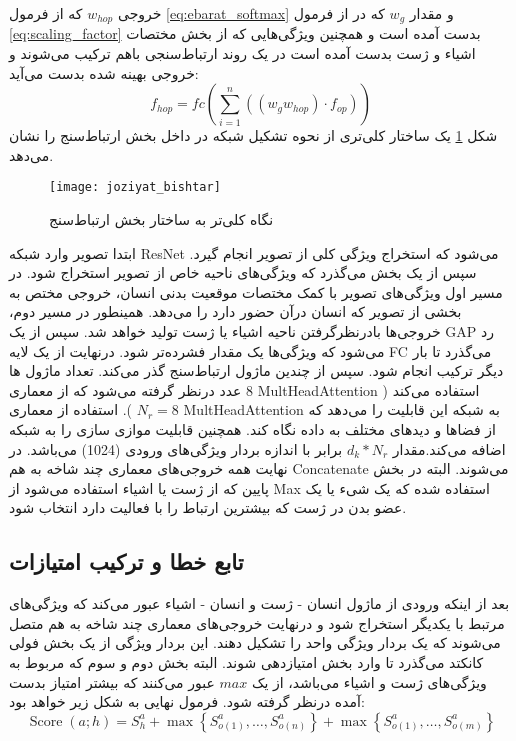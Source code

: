  خروجی %
  $w_{hop}$
  که از فرمول %
 \ref{eq:ebarat_softmax}
  و مقدار %
 $w_g$
 که در از فرمول %
 \ref{eq:scaling_factor}
 بدست آمده است و همچنین ویژگی‌هایی که از بخش مختصات اشیاء و ژست بدست آمده است در یک روند ارتباط‌سنجی باهم ترکیب می‌شوند و خروجی بهینه شده بدست می‌آید:
 \begin{equation}
 	f_{h o p}=f c\left(\sum_{i=1}^n\left(\left(w_g w_{h op}\right) \cdot f_{o p}\right)\right)
 \end{equation}
شکل %
   \ref{fig:joziyat_bishtar}
   یک ساختار کلی‌تری از نحوه تشکیل شبکه در داخل بخش ارتباط‌سنج را نشان می‌دهد. 
     \begin{figure}[ht]
   	\centerline{\texttt{[image: joziyat\_bishtar]}}
   	\caption{نگاه کلی‌تر به ساختار بخش ارتباط‌سنج}
   	\label{fig:joziyat_bishtar}
   \end{figure}
ابتدا تصویر وارد شبکه ResNet می‌شود که استخراج ویژگی‌ کلی از تصویر انجام گیرد. سپس از یک بخش %
 می‌گذرد که ویژگی‌های ناحیه خاص از تصویر استخراج شود. در مسیر اول ویژگی‌های تصویر با کمک مختصات موقعیت بدنی انسان، خروجی مختص به بخشی از تصویر که انسان درآن حضور دارد را ‌می‌دهد. همینطور در مسیر دوم، خروجی‌ها بادرنظرگرفتن ناحیه اشیاء یا ژست تولید خواهد شد. سپس از یک GAP%
 رد می‌شود که ویژگی‌ها یک مقدار فشرده‌تر شود. درنهایت از یک لایه FC%
 می‌گذرد تا بار دیگر ترکیب انجام شود. سپس از چندین ماژول ارتباط‌سنج گذر می‌کند. تعداد ماژول ها 8 عدد درنظر گرفته می‌شود که از معماری %
   \gls{MultHeadAttention}
 استفاده می‌کند (
   $N_r=8$
  ). استفاده از معماری %
     \gls{MultHeadAttention}
  به شبکه این قابلیت را می‌دهد که از فضاها و دید‌های مختلف به داده نگاه کند. همچنین قابلیت موازی سازی را به شبکه اضافه می‌کند.مقدار %
   $d_k*N_r$
   برابر با اندازه بردار ویژگی‌های ورودی (1024) می‌باشد. در نهایت همه‌ خروجی‌های معماری چند شاخه به هم %
\gls{Concatenate}
    می‌شوند. البته در بخش پایین که از ژست یا اشیاء استفاده می‌شود از Max استفاده شده که یک شیء یا یک
عضو بدن در ژست که بیشترین ارتباط را با فعالیت دارد انتخاب شود.
      \subsection{تابع خطا و ترکیب امتیازات}
   بعد از اینکه ورودی از ماژول انسان - ژست و انسان - اشیاء عبور می‌کند که ویژگی‌های مرتبط با یکدیگر استخراج شود و درنهایت خروجی‌های معماری چند شاخه به هم متصل می‌شوند که یک بردار ویژگی واحد را تشکیل دهند. این بردار ویژگی از یک بخش فولی کانکتد می‌گذرد تا وارد بخش امتیازدهی شوند. 
   البته بخش دوم و سوم که مربوط به ویژگی‌های ژست و اشیاء می‌باشد، از یک %
   $max$
   عبور می‌کنند که بیشتر امتیاز بدست آمده درنظر گرفته شود. فرمول نهایی به شکل زیر خواهد بود:
   \begin{equation}
   	\operatorname{Score}(a ; h)=S_h^a+\max \left\{S_{o(1)}^a, \ldots, S_{o(n)}^a\right\}+\max \left\{S_{o(1)}^a, \ldots, S_{o(m)}^a\right\}
   \end{equation}
   
